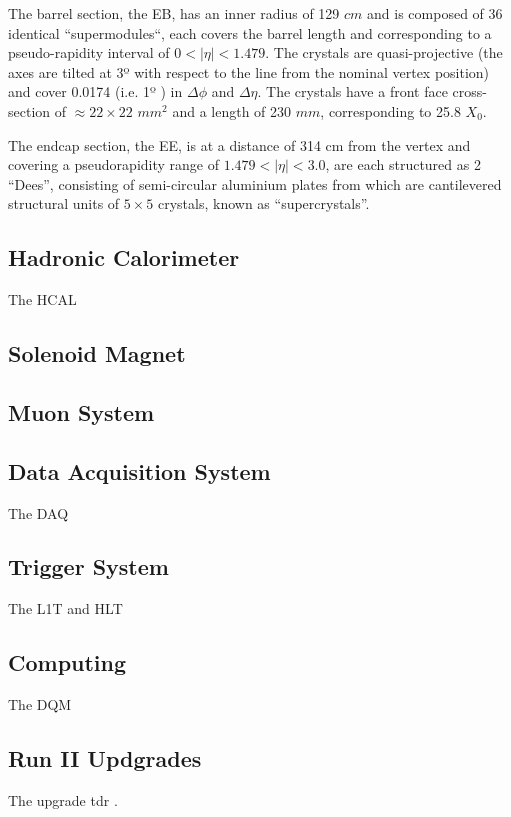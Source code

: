 The barrel section, the \gls{EB}, has an inner radius of 129 $cm$ and is composed of 36 identical ``supermodules``, each covers the barrel length and corresponding to a pseudo-rapidity interval of $0<|\eta|<1.479$. The crystals are quasi-projective (the axes are tilted at 3º with respect to the line from the nominal vertex position) and cover 0.0174 (i.e. 1º ) in $\Delta\phi$ and $\Delta\eta$. The crystals have a front face cross-section of $\approx 22\times22$ $mm^2$ and a length of 230 $mm$, corresponding to 25.8 $X_0$.

The endcap section, the \gls{EE}, is at a distance of 314 cm from the vertex and covering a pseudorapidity range of $1.479<|\eta|<3.0$, are each structured as 2 “Dees”, consisting of semi-circular aluminium plates from which are cantilevered structural units of $5\times5$ crystals, known as “supercrystals”.

\subsection{Hadronic Calorimeter}
\label{SUBSECTION:ExperimentalApparatus_CMS_HCAL}

The \gls{HCAL}

\subsection{Solenoid Magnet}
\label{SUBSECTION:ExperimentalApparatus_CMS_Magnet}



\subsection{Muon System}
\label{SUBSECTION:ExperimentalApparatus_CMS_Mouns}

\subsection{Data Acquisition System}
\label{SUBSECTION:ExperimentalApparatus_CMS_DAQ}

The \gls{DAQ}

\subsection{Trigger System}
\label{SUBSECTION:ExperimentalApparatus_CMS_Trigger}

The \gls{L1T} and \gls{HLT}

\subsection{Computing}
\label{SUBSECTION:ExperimentalApparatus_CMS_Computing}

The \gls{DQM} 

\subsection{Run II Updgrades}
\label{SUBSECTION:ExperimentalApparatus_CMS_RUNII}

The upgrade tdr \cite{CMSTDR:CMSL1Upgrade}.
